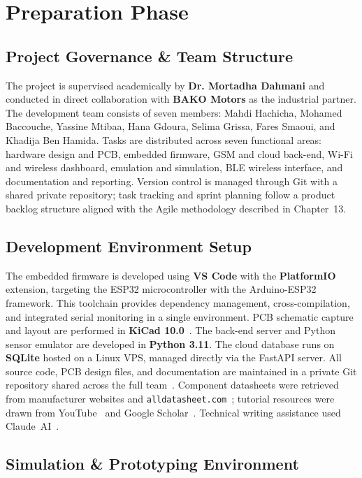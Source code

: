 \section{Preparation Phase}

\subsection{Project Governance \& Team Structure}

The project is supervised academically by \textbf{Dr. Mortadha Dahmani} and conducted in direct collaboration with \textbf{BAKO Motors} as the industrial partner. The development team consists of seven members: Mahdi Hachicha, Mohamed Baccouche, Yassine Mtibaa, Hana Gdoura, Selima Grissa, Fares Smaoui, and Khadija Ben Hamida. Tasks are distributed across seven functional areas: hardware design and PCB, embedded firmware, GSM and cloud back-end, Wi-Fi and wireless dashboard, emulation and simulation, BLE wireless interface, and documentation and reporting. Version control is managed through Git with a shared private repository; task tracking and sprint planning follow a product backlog structure aligned with the Agile methodology described in Chapter~13.

\subsection{Development Environment Setup}

The embedded firmware is developed using \textbf{VS Code} with the \textbf{PlatformIO}~\cite{platformio} extension, targeting the ESP32 microcontroller with the Arduino-ESP32 framework. This toolchain provides dependency management, cross-compilation, and integrated serial monitoring in a single environment. PCB schematic capture and layout are performed in \textbf{KiCad 10.0}~\cite{kicad,snapeda,kicadforum}. The back-end server and Python sensor emulator are developed in \textbf{Python 3.11}. The cloud database runs on \textbf{SQLite} hosted on a Linux VPS, managed directly via the FastAPI server. All source code, PCB design files, and documentation are maintained in a private Git repository shared across the full team~\cite{github}. Component datasheets were retrieved from manufacturer websites and \texttt{alldatasheet.com}~\cite{alldatasheet}; tutorial resources were drawn from YouTube~\cite{youtube} and Google Scholar~\cite{googlescholar}. Technical writing assistance used Claude~AI~\cite{claudeai}.

\subsection{Simulation \& Prototyping Environment}

